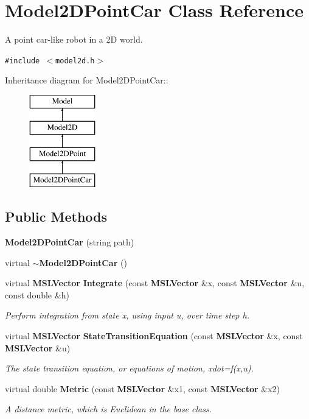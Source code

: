 \section{Model2DPoint\-Car  Class Reference}
\label{classModel2DPointCar}
A point car-like robot in a 2D world. 


{\tt \#include $<$model2d.h$>$}

Inheritance diagram for Model2DPoint\-Car::\begin{figure}[H]
\begin{center}
\leavevmode
\includegraphics[height=4cm]{classModel2DPointCar}
\end{center}
\end{figure}
\subsection*{Public Methods}
\begin{CompactItemize}
\item 
{\bf Model2DPoint\-Car} (string path)
\item 
virtual {\bf $\sim$Model2DPoint\-Car} ()
\item 
virtual {\bf MSLVector} {\bf Integrate} (const {\bf MSLVector} \&x, const {\bf MSLVector} \&u, const double \&h)
\begin{CompactList}\small\item\em Perform integration from state x, using input u, over time step h.\item\end{CompactList}\item 
virtual {\bf MSLVector} {\bf State\-Transition\-Equation} (const {\bf MSLVector} \&x, const {\bf MSLVector} \&u)
\begin{CompactList}\small\item\em The state transition equation, or equations of motion, xdot=f(x,u).\item\end{CompactList}\item 
virtual double {\bf Metric} (const {\bf MSLVector} \&x1, const {\bf MSLVector} \&x2)
\begin{CompactList}\small\item\em A distance metric, which is Euclidean in the base class.\item\end{CompactList}\end{CompactItemize}
